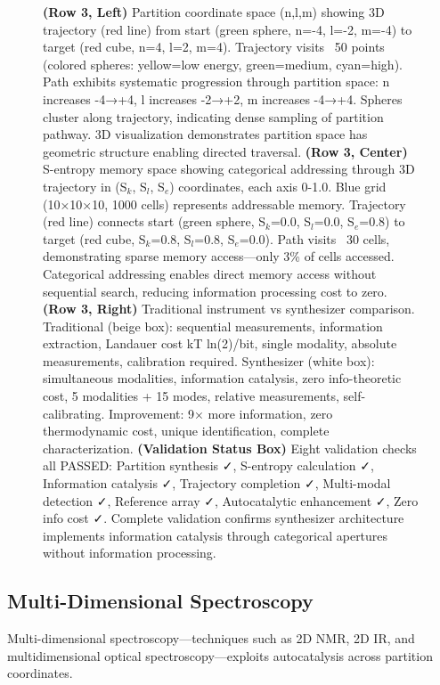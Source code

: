 \begin{figure}[htbp]
{    \textbf{(Row 3, Left)} Partition coordinate space (n,l,m) showing 3D trajectory (red line) from start (green sphere, n=-4, l=-2, m=-4) to target (red cube, n=4, l=2, m=4). Trajectory visits ~50 points (colored spheres: yellow=low energy, green=medium, cyan=high). Path exhibits systematic progression through partition space: n increases -4→+4, l increases -2→+2, m increases -4→+4. Spheres cluster along trajectory, indicating dense sampling of partition pathway. 3D visualization demonstrates partition space has geometric structure enabling directed traversal. 
    \textbf{(Row 3, Center)} S-entropy memory space showing categorical addressing through 3D trajectory in (S$_k$, S$_l$, S$_e$) coordinates, each axis 0-1.0. Blue grid (10×10×10, 1000 cells) represents addressable memory. Trajectory (red line) connects start (green sphere, S$_k$=0.0, S$_l$=0.0, S$_e$=0.8) to target (red cube, S$_k$=0.8, S$_l$=0.8, S$_e$=0.0). Path visits ~30 cells, demonstrating sparse memory access—only 3\% of cells accessed. Categorical addressing enables direct memory access without sequential search, reducing information processing cost to zero. 
    \textbf{(Row 3, Right)} Traditional instrument vs synthesizer comparison. Traditional (beige box): sequential measurements, information extraction, Landauer cost kT ln(2)/bit, single modality, absolute measurements, calibration required. Synthesizer (white box): simultaneous modalities, information catalysis, zero info-theoretic cost, 5 modalities + 15 modes, relative measurements, self-calibrating. Improvement: 9× more information, zero thermodynamic cost, unique identification, complete characterization. 
    \textbf{(Validation Status Box)} Eight validation checks all PASSED: Partition synthesis ✓, S-entropy calculation ✓, Information catalysis ✓, Trajectory completion ✓, Multi-modal detection ✓, Reference array ✓, Autocatalytic enhancement ✓, Zero info cost ✓. Complete validation confirms synthesizer architecture implements information catalysis through categorical apertures without information processing.}
    \label{fig:synthesizer_architecture}
\end{figure}

\subsection{Multi-Dimensional Spectroscopy}

Multi-dimensional spectroscopy—techniques such as 2D NMR, 2D IR, and multidimensional optical spectroscopy—exploits autocatalysis across partition coordinates.

